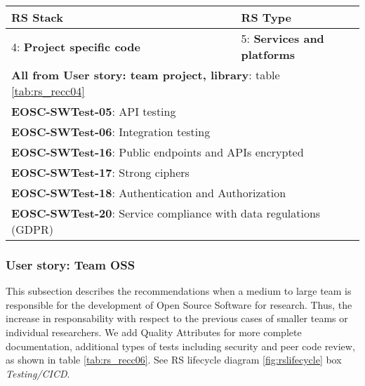 \begin{center}
  \label{tab:rs_recc05}
  \small
  \begin{tabular}{|p{0.65\linewidth}|p{0.35\linewidth}|} \hline

    \textbf{RS Stack} & \textbf{RS Type} \\ \hline \hline
    4: \textbf{Project specific code} &
    5: \textbf{Services and platforms} \\ \hline \hline
    \multicolumn{2}{|l|}{\textbf{All from User story: team project, library}: table \ref{tab:rs_recc04}} \\ \hline
    \multicolumn{2}{|l|}{\textbf{EOSC-SWTest-05}: API testing} \\ \hline
    \multicolumn{2}{|l|}{\textbf{EOSC-SWTest-06}: Integration testing} \\ \hline
    \multicolumn{2}{|l|}{\textbf{EOSC-SWTest-16}: Public endpoints and APIs encrypted} \\ \hline
    \multicolumn{2}{|l|}{\textbf{EOSC-SWTest-17}: Strong ciphers} \\ \hline
    \multicolumn{2}{|l|}{\textbf{EOSC-SWTest-18}: Authentication and Authorization} \\ \hline
    \multicolumn{2}{|l|}{\textbf{EOSC-SWTest-20}: Service compliance with data regulations (GDPR)} \\ \hline

  \end{tabular}
\end{center}

\subsubsection{User story: Team OSS}

This subsection describes the recommendations when a medium to large team is responsible for the development of Open Source Software for research. Thus, the increase in responsability with respect to the previous cases of smaller teams or individual researchers. We add Quality Attributes for more complete documentation, additional types of tests including security and peer code review, as shown in table \ref{tab:rs_recc06}. See RS lifecycle diagram \ref{fig:rslifecycle} box \textit{Testing/CICD}.

